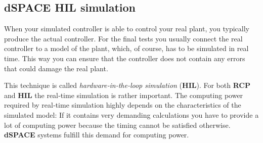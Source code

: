 \subsection{dSPACE HIL simulation}
When your simulated controller is able to control your real plant, you typically produce the actual controller. For the final tests you usually connect the real controller to a model of the plant, which, of course, has to be simulated in real time. This way you can ensure that the controller does not contain any errors that could damage the real plant.\par
This technique is called \emph{hardware‑in‑the‑loop simulation} (\textbf{HIL}). For both \textbf{RCP} and \textbf{HIL} the real‑time simulation is rather important. The computing power required by real‑time simulation highly depends on the characteristics of the simulated model: If it contains very demanding calculations you have to provide a lot of computing power because the timing cannot be satisfied otherwise. \textbf{dSPACE} systems fulfill this demand for computing power.\\
